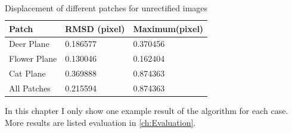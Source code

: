 \begin{table}[htbp]
	\centering
	\scriptsize   
	\begin{tabular}{p{80pt} p{60pt} p{60pt}}
		\toprule
		 Patch & {\bfseries RMSD (pixel)} & {\bfseries Maximum(pixel)}\\ \midrule
		 Deer Plane&  0.186577&0.370456 \\
		 \addlinespace[3pt]
		 Flower Plane  &  0.130046&0.162404 \\
		 \addlinespace[3pt]
		 Cat Plane & 0.369888&0.874363 \\ 
		 \addlinespace[3pt]
		 All Patches & 0.215594&0.874363 \\ \bottomrule
	\end{tabular}
	\caption{Displacement of different patches for unrectified images}  
	\label{tab:Displacement of different patches for unrectified images} 
\end{table}
In this chapter I only show one example result of the algorithm for each case. More results are listed evaluation in \cref{ch:Evaluation}.







